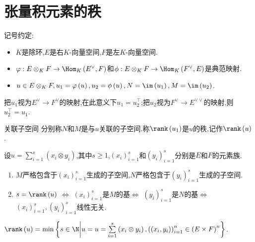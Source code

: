 \section{张量积元素的秩}

记号约定:
\begin{itemize}
	\item $K$是除环,$E$是右$K$-向量空间,$F$是左$K$-向量空间.
	\item $\varphi:E\otimes_{K}F\to\Hom_{K}\left(E^{\vee},F\right)$和$\phi:E\otimes_{K}F\to\Hom_{K}\left(F^{\vee},E\right)$是典范映射.
	\item $u\in E\otimes_{K}F,u_{1}=\varphi\left(u\right),u_{2}=\phi\left(u\right),N=\im\left(u_{1}\right),M=\im\left(u_{2}\right)$.
\end{itemize}

把$u_{1}$视为$E^{\vee}\to F^{\vee}$的映射,在此意义下$u_{1}=u_{2}^{\top}$;把$u_{2}$视为$F^{\vee}\to E^{\vee\vee}$的映射,则$u_{2}^{\top}=u_{1}$.

\begin{definition}{关联子空间}{}
	分别称$N$和$M$是与$u$关联的子空间.称$\rank\left(u_{1}\right)$是$u$的秩,记作$\rank\left(u\right)$.
\end{definition}

\begin{proposition}{}{}
	设$u=\sum\limits_{i=1}^{s}\left(x_{i}\otimes y_{i}\right)$,其中$s\geq 1$,$\left(x_{i}\right)_{i=1}^{s}$和$\left(y_{i}\right)_{i=1}^{s}$分别是$E$和$F$的元素族.
	\begin{enumerate}
		\item $M$严格包含于$\left(x_{i}\right)_{i=1}^{s}$生成的子空间,$N$严格包含于$\left(y_{i}\right)_{i=1}^{s}$生成的子空间.
		\item $s=\rank\left(u\right)$ $\iff$ $\left(x_{i}\right)_{i=1}^{s}$是$M$的基$\iff$ $\left(y_{i}\right)_{i=1}^{s}$是$N$的基$\iff$ $\left(x_{i}\right)_{i=1}^{s},\left(y_{i}\right)_{i=1}^{s}$线性无关.
	\end{enumerate}
\end{proposition}

\begin{corollary}{}{}
	$\rank\left(u\right)=\min\left\{s\in\N\middle|u=u=\sum\limits_{i=1}^{s}\left(x_{i}\otimes y_{i}\right),\left(\left(x_{i},y_{i}\right)\right)_{i=1}^{n}\in\left(E\times F\right)^{n}\right\}$.
\end{corollary}

